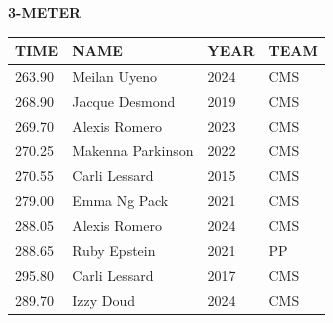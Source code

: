 \begin{table}[H]
\centering
\begin{minipage}[t]{0.6\textwidth}
\centering
\textbf{3-METER}\\[0.1cm]
\begin{tabular}{@{}p{1.8cm}p{2.8cm}p{1.2cm}p{1.4cm}@{}}
\hline
    \textbf{TIME} & \textbf{NAME} & \textbf{YEAR} & \textbf{TEAM} \\
\hline
    263.90 & Meilan Uyeno & 2024 & CMS \\
    268.90 & Jacque Desmond & 2019 & CMS \\
    269.70 & Alexis Romero & 2023 & CMS \\
    270.25 & Makenna Parkinson & 2022 & CMS \\
    270.55 & Carli Lessard & 2015 & CMS \\
    279.00 & Emma Ng Pack & 2021 & CMS \\
    288.05 & Alexis Romero & 2024 & CMS \\
    288.65 & Ruby Epstein & 2021 & PP \\
    295.80 & Carli Lessard & 2017 & CMS \\
    289.70 & Izzy Doud & 2024 & CMS \\
\hline
\end{tabular}
\end{minipage}
\end{table}


\newpage



